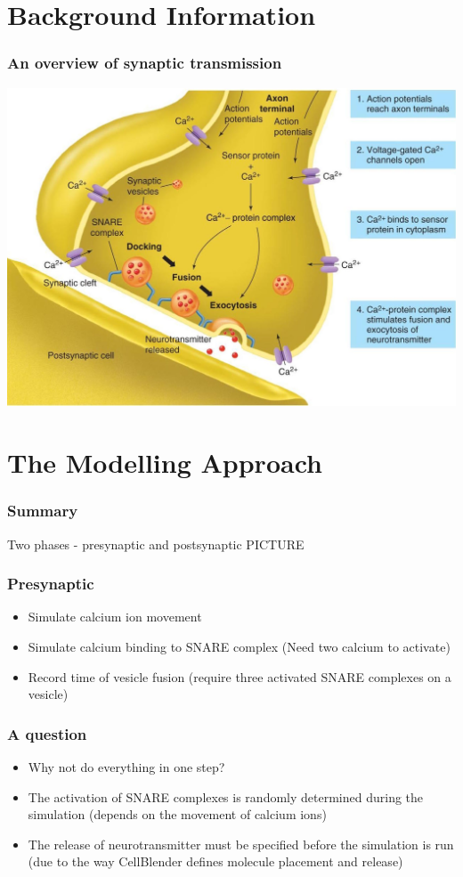 \documentclass{beamer}
\begin{document}
\section{Background Information}

\frame
{
    \frametitle{An overview of synaptic transmission}
    \includegraphics[width=1\textwidth]{fig1.jpg}
}


\section{The Modelling Approach}
\frame
{
    \frametitle{Summary}
    Two phases - presynaptic and postsynaptic
    PICTURE 

}

\frame
{
    \frametitle{Presynaptic}
    \begin{itemize}
        \item Simulate calcium ion movement
        \item Simulate calcium binding to SNARE complex (Need two calcium to activate)
        \item Record time of vesicle fusion (require three activated SNARE complexes on a vesicle)
    \end{itemize}
}

\frame
{ \frametitle{A question}
    \begin{itemize}
        \item Why not do everything in one step?
        \item The activation of SNARE complexes is randomly determined during the simulation (depends on the movement of calcium ions)
        \item The release of neurotransmitter must be specified before the simulation is run (due to the way CellBlender defines molecule placement and release)
    \end{itemize}
}
\end{document}
